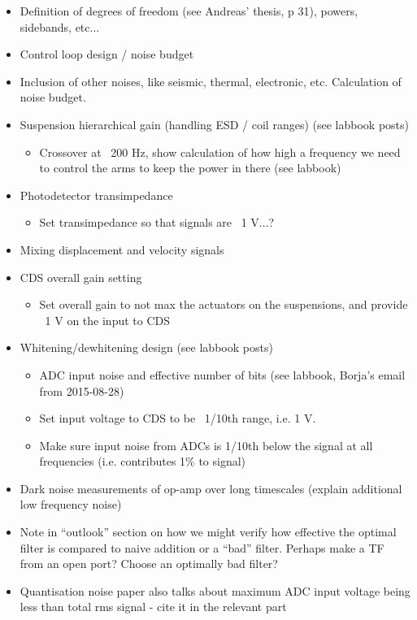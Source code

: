 \begin{itemize}
  \item Definition of degrees of freedom (see Andreas' thesis, p 31), powers, sidebands, etc...
  \item Control loop design / noise budget
  \item Inclusion of other noises, like seismic, thermal, electronic, etc. Calculation of noise budget.
  \item Suspension hierarchical gain (handling ESD / coil ranges) (see labbook posts)
     \begin{itemize}
        \item Crossover at ~200 Hz, show calculation of how high a frequency we need to control the arms to keep the power in there (see labbook)
     \end{itemize}
  \item Photodetector transimpedance
    \begin{itemize}
      \item Set transimpedance so that signals are ~1 V...?
    \end{itemize}
  \item Mixing displacement and velocity signals
  \item CDS overall gain setting
    \begin{itemize}
      \item Set overall gain to not max the actuators on the suspensions, and provide ~1 V on the input to CDS
    \end{itemize}
  \item Whitening/dewhitening design (see labbook posts)
    \begin{itemize}
      \item ADC input noise and effective number of bits (see labbook, Borja's email from 2015-08-28)
      \item Set input voltage to CDS to be ~1/10th range, i.e. 1 V.
      \item Make sure input noise from ADCs is 1/10th below the signal at all frequencies (i.e. contributes 1\% to signal)
    \end{itemize}
  \item Dark noise measurements of op-amp over long timescales (explain additional low frequency noise)
  \item Note in ``outlook'' section on how we might verify how effective the optimal filter is compared to naive addition or a ``bad'' filter. Perhaps make a TF from an open port? Choose an optimally bad filter?
  \item Quantisation noise paper also talks about maximum ADC input voltage being less than total rms signal - cite it in the relevant part
\end{itemize}

